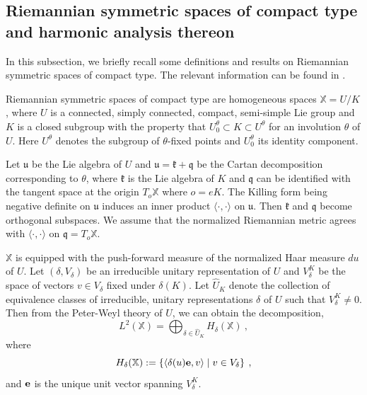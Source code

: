 \documentclass[12pt]{amsart}
\theoremstyle{definition}
\newcommand{\what}{\widehat}
\newcommand{\X}{\mathbb X}%
\numberwithin{equation}{section}
\begin{document}
\subsection{Riemannian symmetric spaces of compact type and harmonic analysis thereon} In this subsection, we briefly recall some definitions and results on Riemannian symmetric spaces of compact type. The relevant information can be found in  \cite{HelgasonDiff,HelSymm, Helgason, OS}.

Riemannian symmetric spaces of compact type are homogeneous spaces $\X=U/K$, where $U$ is a connected, simply connected, compact, semi-simple Lie group and $K$ is a closed subgroup with the property that $U^\theta_0 \subset K \subset U^\theta$ for an involution $\theta$ of $U$. Here $U^\theta$ denotes the subgroup of $\theta$-fixed points and $U^\theta_0$ its identity component.

Let $\mathfrak{u}$ be the Lie algebra of $U$ and $\mathfrak{u}=\mathfrak{k}+\mathfrak{q}$ be the Cartan decomposition corresponding to $\theta$, where $\mathfrak{k}$ is the Lie algebra of $K$ and $\mathfrak{q}$ can be identified with the tangent space at the origin $T_o\X$ where $o=eK$. The Killing form being negative definite on $\mathfrak{u}$ induces an inner product $\langle \cdot, \cdot \rangle$ on $\mathfrak{u}$. Then $\mathfrak{k}$ and $\mathfrak{q}$ become orthogonal subspaces. We assume that the normalized Riemannian metric agrees with $\langle \cdot, \cdot \rangle$ on  $\mathfrak{q}=T_o\X$.

$\X$ is equipped with the push-forward measure of the normalized Haar measure $du$ of $U$. Let $(\delta,V_\delta)$ be an irreducible unitary representation of $U$ and $V^K_\delta$ be the space of vectors $v \in V_\delta$ fixed under $\delta(K)$. Let $\what{U}_K$ denote the collection of equivalence classes of irreducible, unitary representations $\delta$ of $U$ such that $V^K_\delta \ne 0$. Then from the Peter-Weyl theory of $U$, we can obtain the decomposition,
\begin{equation} \label{peter-weyl}
L^2(\X) = \bigoplus_{\delta \in \what{U}_K} H_\delta(\X)\:,
\end{equation}
where
\begin{equation*}
H_\delta(\X):= \left\{\langle \delta(u){\bf e}, v   \rangle \mid v \in V_\delta\right\}\:,
\end{equation*}
and ${\bf e}$ is the unique unit vector spanning $V^K_\delta$.
\end{document}
